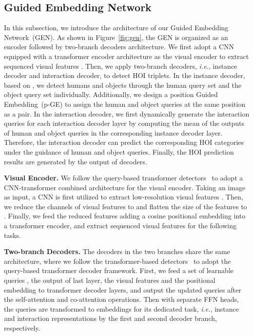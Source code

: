 \documentclass[10pt,twocolumn,letterpaper]{article}
\begin{document}
\vspace{-1mm}\subsection{Guided Embedding Network}\label{sec:pen}\vspace{-1mm}
In this subsection, we introduce the architecture of our Guided Embedding Network~(GEN). As shown in Figure~\ref{fig:gen}, the GEN is organized as an encoder followed by two-branch decoders architecture. We first adopt a CNN equipped with a transformer encoder architecture as the visual encoder to extract sequenced visual features . Then, we apply two-branch decoders, \emph{i.e.}, instance decoder and interaction decoder, to detect HOI triplets. In the instance decoder, based on , we detect humans and objects through the human query set  and the object query set  individually. Additionally, we design a position Guided Embedding~(p-GE)  to assign the human and object queries at the same position as a pair. In the interaction decoder, we first dynamically generate the interaction queries  for each interaction decoder layer by computing the mean of the outputs of human and object queries in the corresponding instance decoder layer. Therefore, the interaction decoder can predict the corresponding HOI categories under the guidance of human and object queries. Finally, the HOI prediction results are generated by the output of decoders.

\vspace{1mm}\noindent\textbf{Visual Encoder.} We follow the query-based transformer detectors~\cite{carion2020endtoend,tamura2021qpic,zou2021_hoitrans} to adopt a CNN-transformer combined architecture for the visual encoder. Taking an image  as input, a CNN is first utilized to extract low-resolution visual features . Then, we reduce the channels of visual features to  and flatten the size of the features to . Finally, we feed the reduced features adding a cosine positional embedding into a transformer encoder, and extract sequenced visual features  for the following tasks.

\vspace{1mm}\noindent\textbf{Two-branch Decoders.} The decoders in the two branches share the same architecture, where we follow the transformer-based detectors~\cite{carion2020endtoend,chen_2021_asnet} to adopt the query-based transformer decoder framework. First, we feed a set of learnable queries , the output of last layer, the visual features  and the positional embedding to  transformer decoder layers, and output the updated queries after the self-attention and co-attention operations. Then with separate FFN heads, the queries are transformed to embeddings for its dedicated task, \emph{i.e.}, instance and interaction representations by the first and second decoder branch, respectively.
\end{document}
